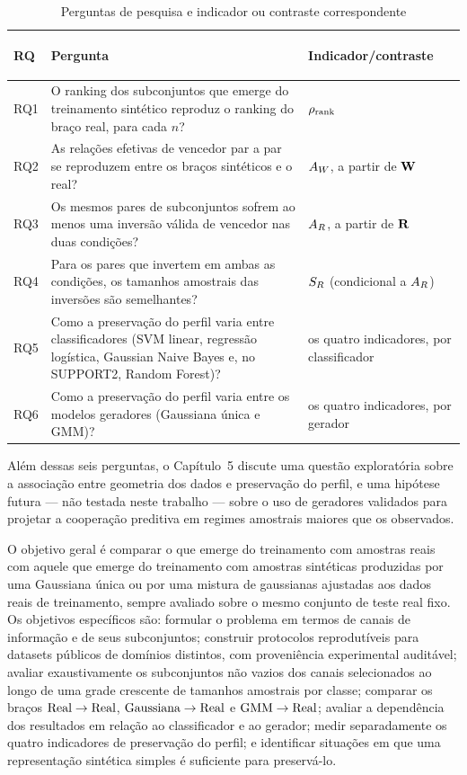\begin{table}[H]
  \centering
  \caption{Perguntas de pesquisa e indicador ou contraste correspondente}
  \label{tab:rq-sintese}
  \begin{tabularx}{\textwidth}{>{\bfseries\raggedright\arraybackslash}p{1.35cm}Xl}
    \toprule
    RQ & Pergunta & Indicador/contraste \\
    \midrule
    RQ1 & O ranking dos subconjuntos que emerge do treinamento sintético reproduz o ranking do braço real, para cada $n$? & $\rho_{\mathrm{rank}}$ \\
    RQ2 & As relações efetivas de vencedor par a par se reproduzem entre os braços sintéticos e o real? & $A_W$, a partir de $\mathbf{W}$ \\
    RQ3 & Os mesmos pares de subconjuntos sofrem ao menos uma inversão válida de vencedor nas duas condições? & $A_R$, a partir de $\mathbf{R}$ \\
    RQ4 & Para os pares que invertem em ambas as condições, os tamanhos amostrais das inversões são semelhantes? & $S_R$ (condicional a $A_R$) \\
    RQ5 & Como a preservação do perfil varia entre classificadores (SVM linear, regressão logística, Gaussian Naive Bayes e, no SUPPORT2, Random Forest)? & os quatro indicadores, por classificador \\
    RQ6 & Como a preservação do perfil varia entre os modelos geradores (Gaussiana única e GMM)? & os quatro indicadores, por gerador \\
    \bottomrule
  \end{tabularx}
\end{table}

Além dessas seis perguntas, o Capítulo~5 discute uma questão exploratória sobre a associação entre geometria dos dados e preservação do perfil, e uma hipótese futura --- não testada neste trabalho --- sobre o uso de geradores validados para projetar a cooperação preditiva em regimes amostrais maiores que os observados.

O objetivo geral é comparar o \PredictiveCooperationProfile{} que emerge do treinamento com amostras reais com aquele que emerge do treinamento com amostras sintéticas produzidas por uma Gaussiana única ou por uma mistura de gaussianas ajustadas aos dados reais de treinamento, sempre avaliado sobre o mesmo conjunto de teste real fixo. Os objetivos específicos são: formular o problema em termos de canais de informação e de seus subconjuntos; construir protocolos reprodutíveis para datasets públicos de domínios distintos, com proveniência experimental auditável; avaliar exaustivamente os subconjuntos não vazios dos canais selecionados ao longo de uma grade crescente de tamanhos amostrais por classe; comparar os braços $\text{Real}\rightarrow\text{Real}$, $\text{Gaussiana}\rightarrow\text{Real}$ e $\text{GMM}\rightarrow\text{Real}$; avaliar a dependência dos resultados em relação ao classificador e ao gerador; medir separadamente os quatro indicadores de preservação do perfil; e identificar situações em que uma representação sintética simples é suficiente para preservá-lo.

